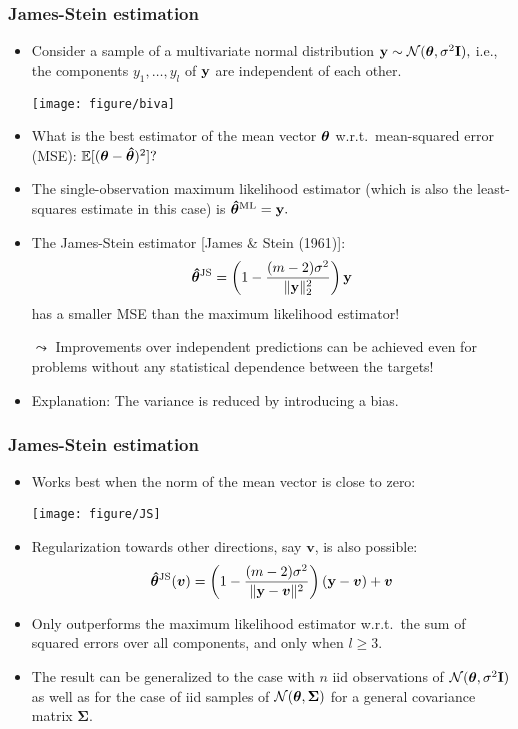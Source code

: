 \documentclass[11pt,compress,t,notes=noshow, xcolor=table]{beamer}
\begin{document}
\begin{frame}
	\frametitle{James-Stein estimation}
%	
	\footnotesize
%	
	\begin{itemize}
%		
		\item Consider a sample of a multivariate normal distribution $\mathbf{y} \sim \mathcal{N}(\bm{\theta}, \sigma^2\mathbf{I}),$ i.e., the components $y_1,\ldots,y_l$ of $\mathbf{y}$ are independent of each other.
%		
		\begin{center}
			\texttt{[image: figure/biva]}
		\end{center}
%		
		\item What is the best estimator of the mean vector $\bm{\theta}$ w.r.t.\ mean-squared error (MSE): $\mathbb{E}[(\bm{\theta} - \bm{\hat\theta})^2]?$  
%		
		\item The single-observation maximum likelihood estimator (which is also the least-squares estimate in this case) is $\bm{\hat\theta}^{\mathrm{ML}} = \mathbf{y}.$  
%		
		\item The James-Stein estimator [James \& Stein (1961)]:
		$$
		\bm{\hat\theta}^{\mathrm{JS}} = \left (1 - \frac{(m-2)\sigma^2}{\|\mathbf{y}\|^2_2} \right )\mathbf{y}
		$$
		has a smaller MSE than the maximum likelihood estimator!
%		
		\item[$\leadsto$] Improvements over independent predictions can be achieved even for problems without any statistical dependence between the targets!
%
		\item Explanation: The variance is reduced by introducing a bias.
%		
%
	\end{itemize}
	
\end{frame}




\begin{frame}
	\frametitle{James-Stein estimation}
	
	\footnotesize
	\begin{itemize}
		
		\item Works best when the norm of the mean vector is close to zero:\\
		\begin{center}
			\texttt{[image: figure/JS]}
		\end{center}  
		\item Regularization towards other directions, say $\bm{v}$, is also possible:
		$$
		\bm{\hat\theta}^{\mathrm{JS}}(\bm{v}) = \left (1 - \frac{(m-2)\sigma^2}{\|\mathbf{y} - \bm{v}\|^2} \right )(\mathbf{y} - \bm{v}) + \bm{v}
		$$
		\item Only outperforms the maximum likelihood estimator w.r.t.\ the sum of squared errors over all components, and only when $l \geq 3.$
		\item The result can be generalized to the case with $n$ iid observations of $\mathcal{N}(\bm{\theta}, \sigma^2\mathbf{I})$ as well as for the case of iid samples of $\mathcal{N}(\bm{\theta}, \bm{\Sigma})$ for a general covariance matrix $\bm{\Sigma}.$
	\end{itemize}
\end{frame}
\end{document}
